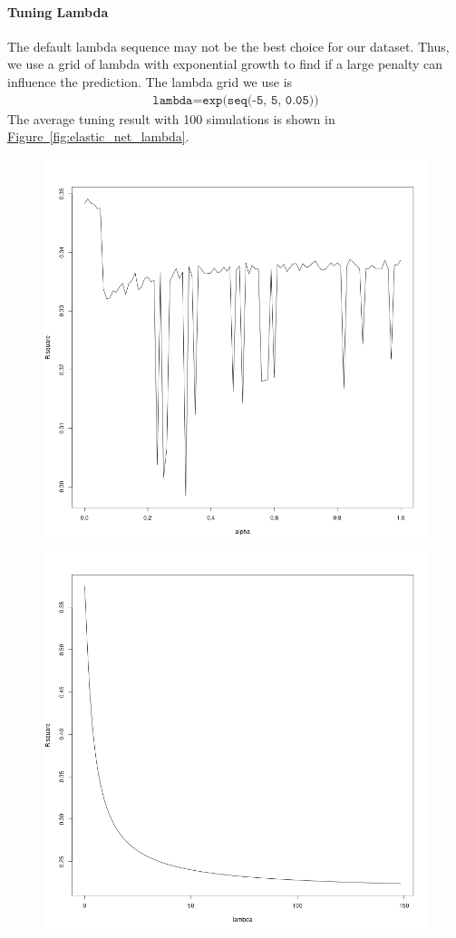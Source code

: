 \documentclass[8pt]{report}
\begin{document}
\paragraph{Tuning Lambda}
The default lambda sequence may not be the best choice for our dataset.
Thus, we use a grid of lambda with exponential growth to find 
if a large penalty can influence the prediction. The lambda grid we use is 
\begin{align*}
    \texttt{lambda} = \texttt{exp(seq(-5, 5, 0.05))}
\end{align*}
The average tuning result with 100 simulations is shown in \hyperref[fig:elastic_net_lambda]{Figure~\ref*{fig:elastic_net_lambda}}.
\begin{figure}[H]
    \centering
    \includegraphics*[scale=0.15]{figures/elastic_net.png}
    \includegraphics*[scale=0.15]{figures/lambda.png}

\end{figure}
\end{document}
